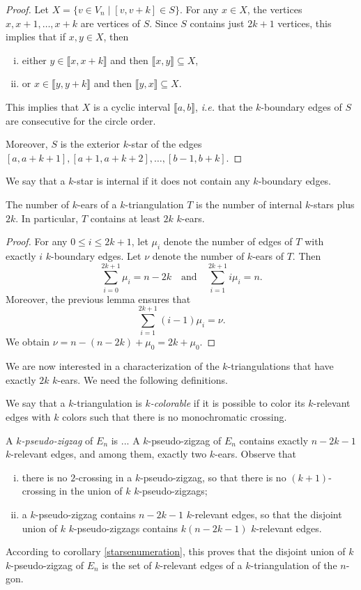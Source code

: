 \documentclass[12pt]{amsart}
\begin{document}
\begin{proof}
Let $X=\{v\in V_n\;|\; [v,v+k]\in S\}$. For any $x\in X$, the vertices $x,x+1,\ldots,x+k$ are vertices of $S$. Since $S$ contains just $2k+1$ vertices, this implies that if $x,y\in X$, then 
\begin{enumerate}[(i)]
\item either $y\in\llbracket x, x+k\rrbracket$ and then $\llbracket x, y\rrbracket\subseteq X$,
\item or $x\in\llbracket y, y+k\rrbracket$ and then $\llbracket y,x\rrbracket\subseteq X$.
\end{enumerate}
This implies that $X$ is a cyclic interval $\llbracket a,b\rrbracket$, {\it i.e.} that the $k$-boundary edges of $S$ are consecutive for the circle order.

Moreover, $S$ is the exterior $k$-star of the edges $[a,a+k+1],[a+1,a+k+2],\ldots, [b-1,b+k]$.
\end{proof}

We say that a $k$-star is internal if it does not contain any $k$-boundary edges.

\begin{lemma}
The number of $k$-ears of a $k$-triangulation $T$ is the number of internal $k$-stars plus $2k$.
In particular, $T$ contains at least $2k$ $k$-ears.
\end{lemma}

\begin{proof}
For any $0\le i\le 2k+1$, let $\mu_i$ denote the number of edges of $T$ with exactly $i$ $k$-boundary edges. Let $\nu$ denote the number of $k$-ears of $T$. Then
$$\sum_{i=0}^{2k+1} \mu_i=n-2k \quad \mathrm{and}\quad \sum_{i=1}^{2k+1} i\mu_i=n.$$
Moreover, the previous lemma ensures that
$$\sum_{i=1}^{2k+1} (i-1)\mu_i=\nu.$$
We obtain $\nu=n-(n-2k)+\mu_0=2k+\mu_0$.
\end{proof}

We are now interested in a characterization of the $k$-triangulations that have exactly $2k$ $k$-ears. We need the following definitions.

We say that a $k$-triangulation is \emph{$k$-colorable} if it is possible to color its $k$-relevant edges with $k$ colors such that there is no monochromatic crossing.

A \emph{$k$-pseudo-zigzag} of $E_n$ is ...
A $k$-pseudo-zigzag of $E_n$ contains exactly $n-2k-1$ $k$-relevant edges, and among them, exactly two $k$-ears.
Observe that 
\begin{enumerate}[(i)]
\item there is no $2$-crossing in a $k$-pseudo-zigzag, so that there is no $(k+1)$-crossing in the union of $k$ $k$-pseudo-zigzags;
\item a $k$-pseudo-zigzag contains $n-2k-1$ $k$-relevant edges, so that the disjoint union of $k$ $k$-pseudo-zigzags contains $k(n-2k-1)$ $k$-relevant edges.
\end{enumerate}
According to corollary \ref{starsenumeration}, this proves that the disjoint union of $k$ $k$-pseudo-zigzag of $E_n$ is the set of $k$-relevant edges of a $k$-triangulation of the $n$-gon.
\end{document}
